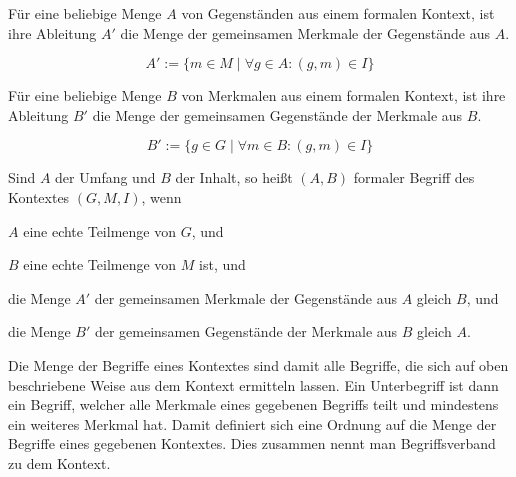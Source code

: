 \documentclass[pagesize,paper=A4,DIV=calc,fontsize=12pt,draft=false]{scrreprt}
\begin{document}
Für eine beliebige Menge $A$ von Gegenständen aus einem formalen Kontext, ist ihre Ableitung $A'$ die Menge der gemeinsamen Merkmale der Gegenstände aus $A$. 

\begin{equation*}
A' := \lbrace m \in M \; \vert \; \forall g \in A: (g,m) \in I\rbrace
\end{equation*}

Für eine beliebige Menge $B$ von Merkmalen aus einem formalen Kontext, ist ihre Ableitung $B'$ die Menge der gemeinsamen Gegenstände der Merkmale aus $B$. 

\begin{equation*}
B' := \lbrace g \in G \; \vert \; \forall m \in B: (g,m) \in I\rbrace
\end{equation*}

Sind $A$ der Umfang und $B$ der Inhalt, so heißt $(A,B)$ formaler Begriff des Kontextes $(G,M,I)$, wenn
\begin{inparaenum}[\itshape 1.)]
\item
 $A$ eine echte Teilmenge von $G$, und
\item
 $B$ eine echte Teilmenge von $M$ ist, und
\item
 die Menge $A'$ der gemeinsamen Merkmale der Gegenstände aus $A$ gleich
 $B$, und
\item
 die Menge $B'$ der gemeinsamen Gegenstände der Merkmale aus $B$ gleich
 $A$.
\end{inparaenum}

Die Menge der Begriffe eines Kontextes sind damit alle Begriffe, die sich auf oben beschriebene Weise aus dem Kontext ermitteln lassen. 
Ein Unterbegriff ist dann ein Begriff, welcher alle Merkmale eines gegebenen Begriffs teilt und mindestens ein weiteres Merkmal hat. 
Damit definiert sich eine Ordnung auf die Menge der Begriffe eines gegebenen Kontextes. 
Dies zusammen nennt man Begriffsverband zu dem Kontext. 
\end{document}
